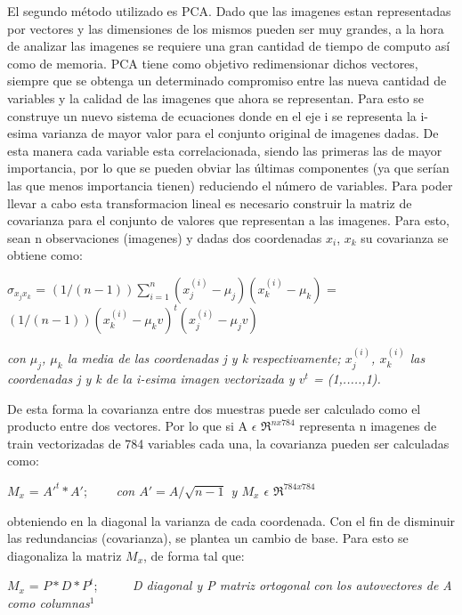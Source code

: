 El segundo método utilizado es PCA. Dado que las imagenes estan representadas por vectores y las dimensiones de los mismos pueden ser muy grandes, a la hora de analizar las imagenes se requiere una gran cantidad de tiempo de computo así como de memoria. PCA tiene como objetivo redimensionar dichos vectores, siempre que se obtenga un determinado compromiso entre las nueva cantidad de variables y la calidad de las imagenes que ahora se representan. Para esto se construye un nuevo sistema de ecuaciones donde en el eje i se representa la i-esima varianza de mayor valor para el conjunto original de imagenes dadas. De esta manera cada variable esta correlacionada, siendo las primeras las de mayor importancia, por lo que se pueden obviar las últimas componentes (ya que serían las que menos importancia tienen) reduciendo el número de variables. Para poder llevar a cabo esta transformacion lineal es necesario construir la matriz de covarianza para el conjunto de valores que representan a las imagenes.
Para esto, sean n observaciones (imagenes) y dadas dos coordenadas $x_i$, $x_k$ su covarianza se obtiene como: \newline


$\sigma_{x_j x_k}$ = $(1/(n-1))\sum_{i=1}^{n}(x_{j}^{(i)}-\mu_j)(x_{k}^{(i)}-\mu_k)$  = $(1/(n-1))(x_{k}^{(i)}-\mu_kv)^{t}(x_{j}^{(i)}-\mu_jv)$ \newline

\textit{con $\mu_j$, $\mu_k$ la media de las coordenadas j y k respectivamente; $x_{j}^{(i)}$, $x_{k}^{(i)}$ las coordenadas j y k de la i-esima imagen vectorizada y $v^{t}$ = (1,.....,1).}\newline

De esta forma la covarianza entre dos muestras puede ser calculado como el producto entre dos vectores. Por lo que si A $\epsilon$ $\Re^{nx784}$ representa n imagenes de train vectorizadas de 784 variables cada una, la covarianza pueden ser calculadas como:\newline

 $M_x$ = $A'^{t}*A'$; \ \ \ \ \textit {con $A'=A/\sqrt{n-1}$ y $M_x$ $\epsilon$  $\Re^{784x784}$} \newline

obteniendo en la diagonal la varianza de cada coordenada. Con el fin de disminuir las redundancias (covarianza), se plantea un cambio de base. Para esto se diagonaliza la matriz $M_x$, de forma tal que: \newline

 $M_x$ = $P*D*P^{t}$; \ \ \ \ \ \textit{D diagonal y P matriz ortogonal con los autovectores de A como columnas$^{1}$} \newline%
 
